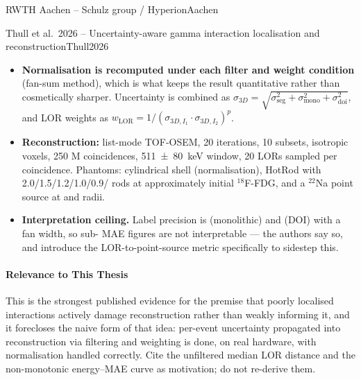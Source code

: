 \begin{programnote}{RWTH Aachen -- Schulz group / Hyperion}{Aachen}
\begin{papernote}{Thull et al.\ 2026 -- Uncertainty-aware gamma interaction localisation and reconstruction}{Thull2026}
\begin{itemize}
        more than 500 detected photons; no energy window is applied until evaluation.
    \item \textbf{Normalisation is recomputed under each filter and weight condition}
        (fan-sum method), which is what keeps the result quantitative rather than
        cosmetically sharper. Uncertainty is combined as
        $\sigma_{3D} = \sqrt{\sigma^2_{\mathrm{seg}} + \sigma^2_{\mathrm{mono}} +
        \sigma^2_{\mathrm{doi}}}$, and LOR weights as
        $w_{\mathrm{LOR}} = 1 / (\sigma_{3D,I_1} \cdot \sigma_{3D,I_2})^p$.
    \item \textbf{Reconstruction:} list-mode TOF-OSEM, 20 iterations, 10 subsets,
         isotropic voxels, 250 M coincidences,
        \qty[separate-uncertainty=true]{511 \pm 80}{\kilo\electronvolt} window,
        20 LORs sampled per coincidence. Phantoms: cylindrical shell (normalisation),
        HotRod with 2.0/1.5/1.2/1.0/0.9/ rods at approximately  initial
        $^{18}$F-FDG, and a  $^{22}$Na point source at  and  radii.
    \item \textbf{Interpretation ceiling.} Label precision is  (monolithic) and
         (DOI) with a  fan width, so sub- MAE figures are not
        interpretable --- the authors say so, and introduce the LOR-to-point-source metric
        specifically to sidestep this.
\end{itemize}

\paragraph{Relevance to This Thesis}
This is the strongest published evidence for the premise that poorly localised
interactions actively damage reconstruction rather than weakly informing it, and it
forecloses the naive form of that idea: per-event uncertainty propagated into
reconstruction via filtering and weighting is done, on real hardware, with normalisation
handled correctly. Cite the  unfiltered median LOR distance and the non-monotonic
energy--MAE curve as motivation; do not re-derive them.


\end{papernote}
\end{programnote}
